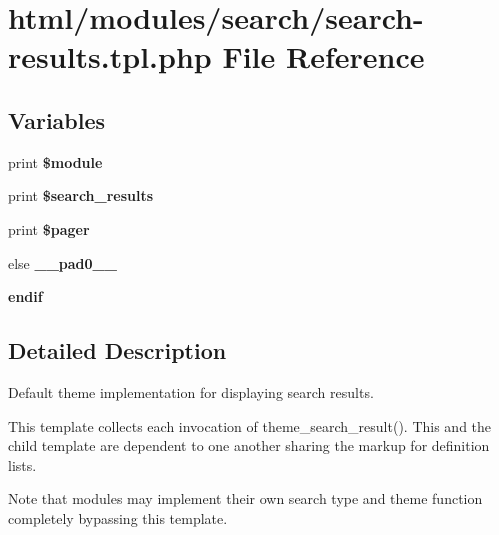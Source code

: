 \hypertarget{search-results_8tpl_8php}{
\section{html/modules/search/search-\/results.tpl.php File Reference}
\label{search-results_8tpl_8php}
}
\subsection*{Variables}
\begin{DoxyCompactItemize}
\item 
\hypertarget{search-results_8tpl_8php_a83fd1a76d85edf4188ef9106f6712db7}{
print {\bfseries \$module}}
\label{search-results_8tpl_8php_a83fd1a76d85edf4188ef9106f6712db7}

\item 
\hypertarget{search-results_8tpl_8php_a585801d7887a0537438a9dcedf0735d1}{
print {\bfseries \$search\_\-results}}
\label{search-results_8tpl_8php_a585801d7887a0537438a9dcedf0735d1}

\item 
\hypertarget{search-results_8tpl_8php_a832d48720a0d8c51e6a14792173c3a61}{
print {\bfseries \$pager}}
\label{search-results_8tpl_8php_a832d48720a0d8c51e6a14792173c3a61}

\item 
\hypertarget{search-results_8tpl_8php_a8e01dcc96c43199448ee66f7c2ae8ea6}{
else {\bfseries \_\-\_\-pad0\_\-\_\-}}
\label{search-results_8tpl_8php_a8e01dcc96c43199448ee66f7c2ae8ea6}

\item 
\hypertarget{search-results_8tpl_8php_a82cd33ca97ff99f2fcc5e9c81d65251b}{
{\bfseries endif}}
\label{search-results_8tpl_8php_a82cd33ca97ff99f2fcc5e9c81d65251b}

\end{DoxyCompactItemize}


\subsection{Detailed Description}
Default theme implementation for displaying search results.

This template collects each invocation of theme\_\-search\_\-result(). This and the child template are dependent to one another sharing the markup for definition lists.

Note that modules may implement their own search type and theme function completely bypassing this template.

